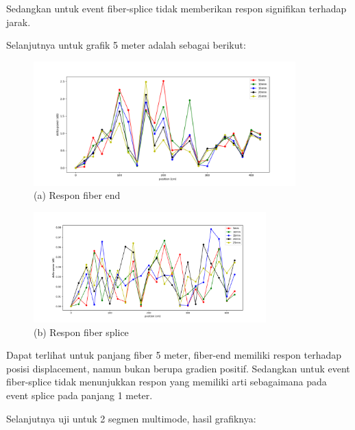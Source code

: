 \documentclass[12pt]{article}
\begin{document}
	Sedangkan untuk event fiber-splice tidak memberikan respon signifikan terhadap jarak.

	Selanjutnya untuk grafik 5 meter adalah sebagai berikut:
	
	\begin{figure}[!ht]
		\centering
		\captionsetup{justification=centering}
		\includegraphics[width=0.9\textwidth]{images/Bab_4/Bab_4_5g1}	
		\caption{\small{(a) Respon fiber end}}
	\end{figure}
	
	\begin{figure}[!ht]
		\centering
		\captionsetup{justification=centering}
		\includegraphics[width=0.8\textwidth]{images/Bab_4/Bab_4_5g2}	
		\caption{\small{(b) Respon fiber splice}}
	\end{figure}

	Dapat terlihat untuk panjang fiber 5 meter, fiber-end memiliki respon terhadap posisi displacement, namun bukan berupa gradien positif. 
	Sedangkan untuk event fiber-splice tidak menunjukkan respon yang memiliki arti sebagaimana pada event splice pada panjang 1 meter.
	
	Selanjutnya uji untuk 2 segmen multimode, hasil grafiknya:
	
\end{document}
